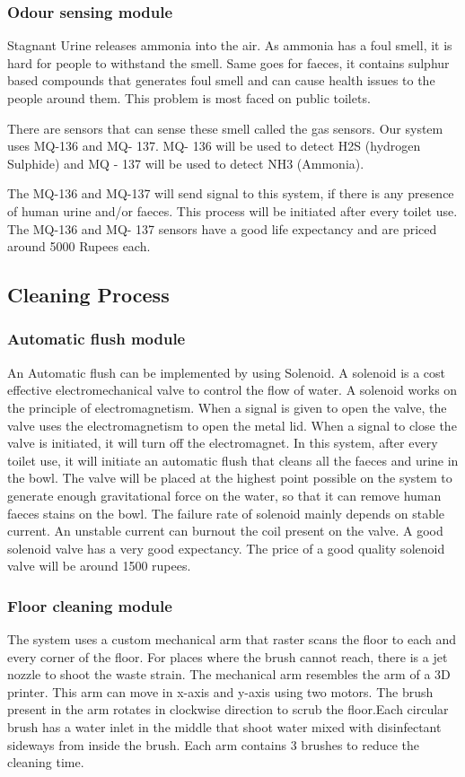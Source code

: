 \documentclass[conference]{IEEEtran}
\begin{document}
        \subsubsection{Odour sensing module}
            Stagnant Urine releases ammonia into the air. As ammonia has a foul smell, it is hard for people to withstand the smell. Same goes for faeces, it contains sulphur based compounds that generates foul smell and can cause health issues to the people around them. This problem is most faced on public toilets.

            There are sensors that can sense these smell called the gas sensors. Our system uses MQ-136 and MQ- 137. MQ- 136 will be used to detect H2S (hydrogen Sulphide) and MQ - 137 will be used to detect NH3 (Ammonia).

            The MQ-136 and MQ-137 will send signal to this system, if there is any presence of human urine and/or faeces. This process will be initiated after every toilet use.
            The MQ-136 and MQ- 137 sensors have a good life expectancy and are priced around 5000 Rupees each.
        \subsection{Cleaning Process}
            \subsubsection{Automatic flush module}
                An Automatic flush can be implemented by using Solenoid. A solenoid is a cost effective electromechanical valve to control the flow of water. A solenoid works on the principle of
                electromagnetism. When a signal is given to open the valve, the valve uses the electromagnetism to open the metal lid. When a signal to close the valve is initiated, it will turn off the electromagnet.
                In this system, after every toilet use, it will initiate an automatic flush that cleans all the faeces and urine in the bowl. The valve will be placed at the highest point possible on the system to generate enough gravitational force on the water, so that it can remove human faeces stains on the bowl.
                The failure rate of solenoid mainly depends on stable current. An unstable current can burnout the coil present on the valve. A good solenoid valve has a very good expectancy. The price of a good quality solenoid valve will be around 1500 rupees.
            \subsubsection{Floor cleaning module}
                The system uses a custom mechanical arm that raster scans the floor to each and every corner of the floor. For places where the brush cannot reach, there is a jet nozzle to shoot the waste strain. The mechanical arm resembles the arm of a 3D printer. This arm can move in x-axis and y-axis using two motors. The brush present in the arm rotates in clockwise direction to scrub the floor.Each circular brush has a water inlet in the middle that shoot water mixed with disinfectant sideways from inside the brush. Each arm contains 3 brushes to reduce the cleaning time.
\end{document}
